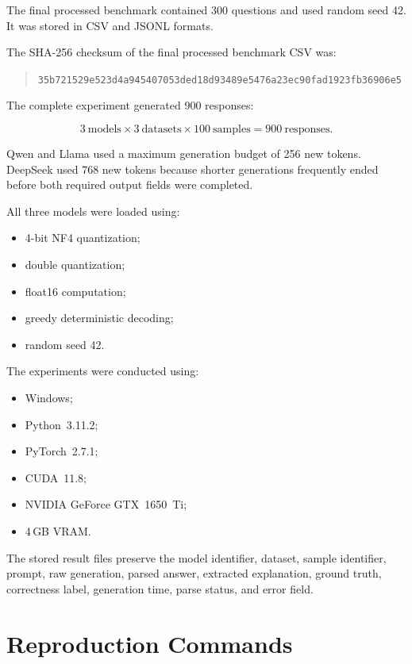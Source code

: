 \documentclass{article}
\begin{document}
The final processed benchmark contained 300 questions and used random
seed 42. It was stored in CSV and JSONL formats.

The SHA-256 checksum of the final processed benchmark CSV was:

\begin{quote}
\small
\texttt{35b721529e523d4a945407053ded18d93489e5476a23ec90fad1923fb36906e5}
\end{quote}

The complete experiment generated 900 responses:

\[
3\ \text{models}
\times
3\ \text{datasets}
\times
100\ \text{samples}
=
900\ \text{responses}.
\]

Qwen and Llama used a maximum generation budget of 256 new tokens.
DeepSeek used 768 new tokens because shorter generations frequently
ended before both required output fields were completed.

All three models were loaded using:

\begin{itemize}
    \item 4-bit NF4 quantization;
    \item double quantization;
    \item float16 computation;
    \item greedy deterministic decoding;
    \item random seed 42.
\end{itemize}

The experiments were conducted using:

\begin{itemize}
    \item Windows;
    \item Python~3.11.2;
    \item PyTorch~2.7.1;
    \item CUDA~11.8;
    \item NVIDIA GeForce GTX~1650~Ti;
    \item 4\,GB VRAM.
\end{itemize}

The stored result files preserve the model identifier, dataset,
sample identifier, prompt, raw generation, parsed answer, extracted
explanation, ground truth, correctness label, generation time, parse
status, and error field.

\section{Reproduction Commands}
\label{app:commands}
\end{document}
